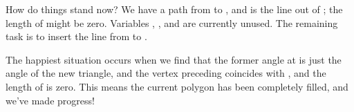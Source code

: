 How do things stand now? We have a path from 
to , and  is
the line out of ; the length of  might be zero. Variables %
, ,
and  are currently unused. The remaining task is to insert the line
from  to .

The happiest situation occurs when we find that the former angle at 
is
just the angle of the new triangle, and the vertex preceding 
coincides
with , and the length of  is zero. This means the current
polygon has been completely filled, and we've made progress!

